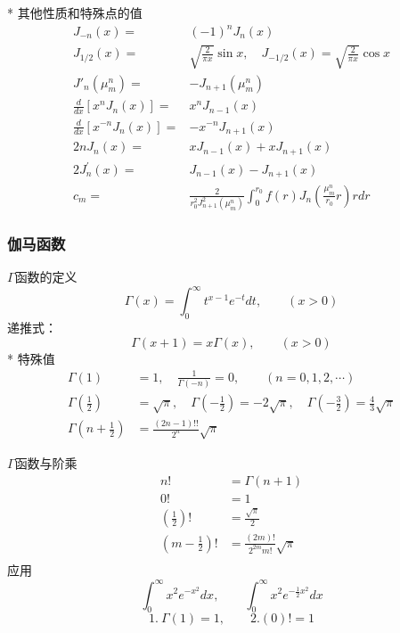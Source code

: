 \begin{frame}
      \frametitle{}
      * 其他性质和特殊点的值 
      \begin{equation*}
		\begin{split}
            J_{-n}(x)= & (-1)^n J_n(x) \\ 
            J_{1/2} (x) =&\sqrt{\frac{2}{\pi x}} \sin x, \quad  J_{-1/2} (x) =\sqrt{\frac{2}{\pi x}} \cos x \\
            J'_n(\mu_m ^n) = & - J_{n+1}(\mu_m ^n) \\
			\frac{d}{d x}\left[x^{n} J_{n}(x)\right]= &x^{n} J_{n-1}(x) \\
			\frac{d}{d x}\left[x^{-n} J_{n}(x)\right]=& -x^{-n} J_{n+1}(x) \\
			2 n J_{n}(x)=&xJ_{n-1}(x)+x J_{n+1}(x)  \\
			2 J_{n}^{\prime}(x)=&J_{n-1}(x)-J_{n+1}(x) \\ 
            c_m=&\frac{2} {r^2_0 J_{n+1} ^2 (\mu_m ^n)} \int_0 ^{r_0} f(r) J_n(\frac{\mu_m ^n}{r_0} r) r dr 
		\end{split}
	\end{equation*}	
\end{frame}

\begin{frame}
      \frametitle{伽马函数}
     $\Gamma$函数的定义	
      \begin{equation*}
          \Gamma(x)=\int_{0}^{\infty} t^{x-1} e^{-t} dt, \qquad (x>0)
      \end{equation*}
        递推式：
		\[\Gamma(x+1)=x \Gamma(x),\qquad (x>0)\]
        * 特殊值 
    \[\begin{aligned}
       \Gamma(1) & =1  , \quad \frac{1}{\Gamma(-n)} =0, \qquad (n=0,1,2, \cdots)  \\
       \Gamma(\frac{1}{2}) &=\sqrt{\pi}, \quad \Gamma(-\frac{1}{2}) =-2\sqrt{\pi}, \quad \Gamma(-\frac{3}{2}) =\frac{4}{3}\sqrt{\pi}\\ 
	   \Gamma(n+\frac{1}{2}) &= \frac{(2n-1)!!}{2^n} \sqrt{\pi}
    \end{aligned} \]
\end{frame}
        
\begin{frame}		    
    $\Gamma$函数与阶乘
        \[\begin{aligned}
            n!&= \Gamma(n+1)\\
            0! &=1 \\
            (\frac{1}{2})! &=  \frac{\sqrt{\pi}}{2} \\ 
            (m-\frac{1}{2})! &=\frac{(2m)!}{2^{2m} m!}\sqrt{\pi} \\
         \end{aligned} \]   
        应用
        \[\int_{0}^{\infty} x^2 e^{-x^2} dx, \qquad \int_{0}^{\infty} x^2 e^{-\frac{1}{2}x^2} dx \] 
        \[1. ~\Gamma(1) =1, \qquad 2.  (0)! =  1\] 

\end{frame}

